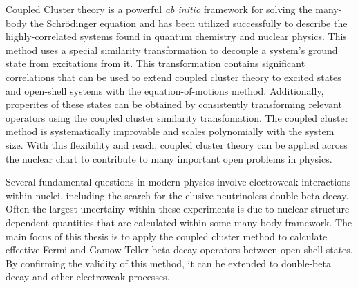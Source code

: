 \documentclass[../thesis.tex]{subfiles}
\begin{document}
Coupled Cluster theory is a powerful \emph{ab initio} framework for solving the many-body the Schr\"{o}dinger equation and has been utilized successfully to describe the highly-correlated systems found in quantum chemistry and nuclear physics.  This method uses a special similarity transformation to decouple a system's ground state from excitations from it.  This transformation contains significant correlations that can be used to extend coupled cluster theory to excited states and open-shell systems with the equation-of-motions method.  Additionally, properites of these states can be obtained by consistently transforming relevant operators using the coupled cluster similarity transfomation.  The coupled cluster method is systematically improvable and scales polynomially with the system size.  With this flexibility and reach, coupled cluster theory can be applied across the nuclear chart to contribute to many important open problems in physics.

Several fundamental questions in modern physics involve electroweak interactions within nuclei, including the search for the elusive neutrinoless double-beta decay.  Often the largest uncertainy within these experiments is due to nuclear-structure-dependent quantities that are calculated within some many-body framework.  The main focus of this thesis is to apply the coupled cluster method to calculate effective Fermi and Gamow-Teller beta-decay operators between open shell states.  By confirming the validity of this method, it can be extended to double-beta decay and other electroweak processes.
\end{document}
